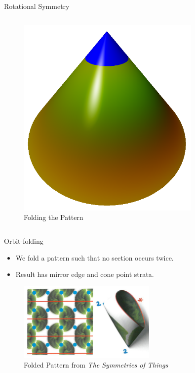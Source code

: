 \documentclass[12pt]{beamer}
\begin{document}
\begin{frame}{Rotational Symmetry}
\begin{columns}
\begin{column}[c]{0.3\textwidth}
\begin{figure}
    \includegraphics[width=0.8\textwidth]{images/cone_point.png}
    \caption{Folding the Pattern}
    \end{figure}
    \end{column}
    \end{columns}
\end{frame}



\begin{frame}{Orbit-folding}
    \begin{itemize}
    \item We fold a pattern such that no section occurs twice.
    \item Result has mirror edge and cone point strata.
    \end{itemize}
    \begin{figure}
    \includegraphics[width=0.6\textwidth]{images/wallpaper.png}
    \caption{Folded Pattern from \textit{The Symmetries of Things}}
    \end{figure}
\end{frame}
\end{document}
